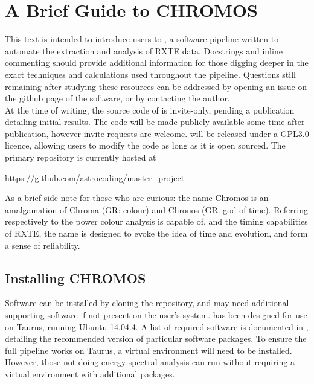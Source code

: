 \chapter{A Brief Guide to CHROMOS}
\label{ch:chromos}

This text is intended to introduce users to \chromos, a software pipeline written to automate the extraction and analysis of \acf{RXTE} data. Docstrings and inline commenting should provide additional information for those digging deeper in the exact techniques and calculations used throughout the pipeline. Questions still remaining after studying these resources can be addressed by opening an issue on the github page of the software, or by contacting the author.\\

At the time of writing, the source code of \chromos is invite-only, pending a publication detailing initial results. The code will be made publicly available some time after publication, however invite requests are welcome. \chromos will be released under a \href{http://choosealicense.com/licenses/gpl-3.0/}{GPL3.0} licence, allowing users to modify the code as long as it is open sourced. The primary repository is currently hosted at
\begin{center}
	\href{https://github.com/astrocoding/master_project}{\url{https://github.com/astrocoding/master_project}}
\end{center}

As a brief side note for those who are curious: the name Chromos is an amalgamation of Chroma (GR: colour) and Chronos (GR: god of time). Referring respectively to the power colour analysis \chromos is capable of, and the timing capabilities of \ac{RXTE}, the name is designed to evoke the idea of time and evolution, and form a sense of reliability.

\section*{Installing CHROMOS}
Software can be installed by cloning the \chromos repository, and may need additional supporting software if not present on the user's system. \chromos has been designed for use on Taurus, running Ubuntu 14.04.4. A list of required software is documented in , detailing the recommended version of particular software packages. To ensure the full pipeline works on Taurus, a virtual environment will need to be installed. However, those not doing energy spectral analysis can run \chromos without requiring a virtual environment with additional packages.

